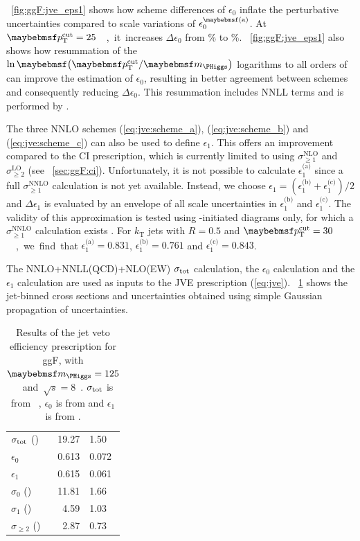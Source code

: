 \Figure~\ref{fig:ggF:jve_eps1} shows how scheme differences of $\epsilon_0$ inflate the 
perturbative uncertainties compared to scale variations of 
$\epsilon_0^{\parenths{\text{a}}}$. At \unit{$\ptcut = 25$}{\GeV}, it increases 
$\Delta\epsilon_0$ from \% to \%. \Figure~\ref{fig:ggF:jve_eps1} also shows 
how resummation of the $\ln\parenths{\ptcut/\mH}$ logarithms to all orders of \alphaS can 
improve the estimation of $\epsilon_0$, resulting in better agreement between schemes and 
consequently reducing $\Delta\epsilon_0$. This resummation includes NNLL terms and is 
performed by \jetvheto \cite{JVE:NNLL}.

The three NNLO schemes (\ref{eq:jve:scheme_a}), (\ref{eq:jve:scheme_b}) and 
(\ref{eq:jve:scheme_c}) can also be used to define $\epsilon_1$. This offers an improvement 
compared to the CI prescription, which is currently limited to using 
$\sigma_{\geq1}^{\text{NLO}}$ and $\sigma_{\geq2}^{\text{LO}}$ (see 
\Section~\ref{sec:ggF:ci}). Unfortunately, it is not possible to calculate 
$\epsilon_1^{\text{(a)}}$ since a full $\sigma_{\geq1}^{\text{NNLO}}$ calculation is not 
yet available. Instead, we choose $\epsilon_1 = (\epsilon_1^{\text{(b)}} + 
\epsilon_1^{\text{(c)}})/2$ and $\Delta\epsilon_1$ is evaluated by an envelope of all scale 
uncertainties in $\epsilon_1^{\text{(b)}}$ and $\epsilon_1^{\text{(c)}}$.
The validity of this approximation is tested using \HepProcess{\Pgluon\Pgluon}-initiated 
diagrams only, for which a $\sigma_{\geq1}^{\text{NNLO}}$ calculation exists 
\cite{H+1j:NNLO}. For $k_{\text{T}}$ jets with $R = 0.5$ and \unit{$\ptcut = 30$}{\GeV}, we 
find that $\epsilon_1^{\text{(a)}} = 0.831$, $\epsilon_1^{\text{(b)}} = 0.761$ and 
$\epsilon_1^{\text{(c)}} = 0.843$.

The NNLO+NNLL(QCD)+NLO(EW) $\sigma_{\text{tot}}$ calculation, the \jetvheto $\epsilon_0$ 
calculation and the \mcfm $\epsilon_1$ calculation are used as inputs to the JVE 
prescription (\ref{eq:jve}). \Table~\ref{tab:ggF:jve} shows the jet-binned cross sections 
and uncertainties obtained using simple Gaussian propagation of uncertainties.

\begin{table}[t]
	\begin{tabular}{l@{\hskip 0.3in}r@{$\,\pm\,$}l}
		\toprule
		$\sigma_{\text{tot}}$ (\pico\barn) & 19.27 & 1.50 \\
		$\epsilon_0$                   & 0.613 & 0.072 \\
		$\epsilon_1$                   & 0.615 & 0.061 \\
		\midrule
		$\sigma_0$ (\pico\barn)        & 11.81 & 1.66 \\
		$\sigma_1$ (\pico\barn)        &  4.59 & 1.03 \\
		$\sigma_{\geq2}$ (\pico\barn)  &  2.87 & 0.73 \\
		\bottomrule
	\end{tabular}
	\caption{Results of the jet veto efficiency prescription for ggF, with 
	\unit{$\mH = 125$}{\GeV} and \unit{$\sqrt{s} = 8$}{\TeV}. $\sigma_{\text{tot}}$ is from 
	\Reference~\cite{YR3}, $\epsilon_0$ is from \jetvheto and $\epsilon_1$ is from \mcfm.}
	\label{tab:ggF:jve}
\end{table}


